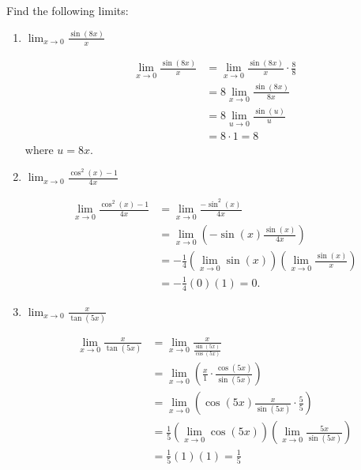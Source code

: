 \documentclass[nooutcomes]{ximera}
\begin{document}
\begin{problem}
Find the following limits:

	\begin{enumerate}
	
	\item  $\lim_{x \to 0} \frac{\sin(8x)}{x}$
			\begin{freeResponse}
			\begin{align*}
			\lim_{x \to 0} \frac{\sin(8x)}{x} &= \lim_{x \to 0} \frac{\sin(8x)}{x} \cdot \frac{8}{8}  \\
			&= 8 \lim_{x \to 0} \frac{\sin(8x)}{8x}  \\
			&= 8 \lim_{u \to 0} \frac{\sin(u)}{u}  \\
			&= 8 \cdot 1 = 8
			\end{align*}
			where $u = 8x$.  
			\end{freeResponse}
			
			
			
	\item  $\lim_{x \to 0} \frac{\cos^2(x) - 1}{4x}$
			\begin{freeResponse}
			\begin{align*}
			\lim_{x \to 0} \frac{\cos^2(x) - 1}{4x} &= \lim_{x \to 0} \frac{- \sin^2(x)}{4x}  \\
			&= \lim_{x \to 0} \left(- \sin(x) \frac{\sin(x)}{4x} \right)  \\
			&= - \frac{1}{4} \left( \lim_{x \to 0} \sin(x) \right) \left( \lim_{x \to 0} \frac{\sin(x)}{x} \right)  \\
			&= - \frac{1}{4} (0) (1) = 0.
			\end{align*}
			\end{freeResponse}
			
			
			
	\item  $\lim_{x \to 0} \frac{x}{\tan(5x)}$
			\begin{freeResponse}
			\begin{align*}
			\lim_{x \to 0} \frac{x}{\tan(5x)} &= \lim_{x \to 0} \frac{x}{\frac{\sin(5x)}{\cos(5x)}}  \\
			&= \lim_{x \to 0} \left( \frac{x}{1} \cdot \frac{\cos(5x)}{\sin(5x)} \right)  \\
			&= \lim_{x \to 0} \left( \cos(5x) \frac{x}{\sin(5x)} \cdot \frac{5}{5} \right)  \\
			&= \frac{1}{5} \left( \lim_{x \to 0} \cos(5x) \right) \left( \lim_{x \to 0} \frac{5x}{\sin(5x)} \right)  \\
			&= \frac{1}{5} (1) (1) = \frac{1}{5}
			\end{align*}
			\end{freeResponse}
			
			
			
	\end{enumerate}
\end{problem}
	
\end{document}
